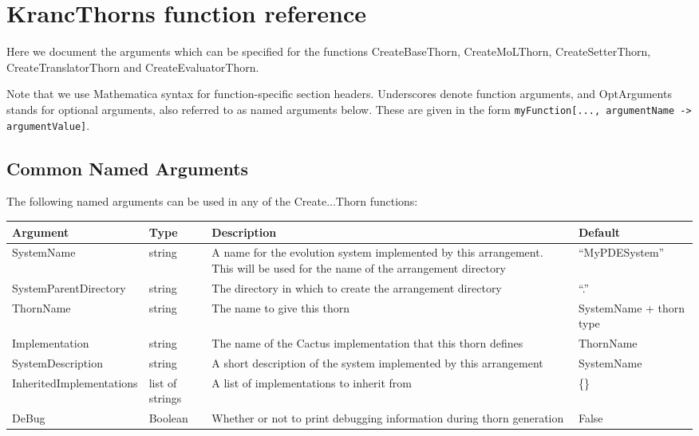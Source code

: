 \documentclass{report}
\newcommand{\tablewidth}{\textwidth}
\begin{document}
\section{KrancThorns function reference}
\label{app:function_reference}

Here we document the arguments which can be specified for the
functions CreateBaseThorn, CreateMoLThorn, CreateSetterThorn,
CreateTranslatorThorn and CreateEvaluatorThorn.

Note that we use Mathematica syntax for function-specific section headers.
Underscores denote function arguments, and OptArguments stands for optional
arguments, also referred to as named arguments below.  These
are given in the form {\tt myFunction[..., argumentName -> argumentValue]}.


\subsection{Common Named Arguments}
\label{app:common_arguments}

The following named arguments can be used in any of the Create...Thorn
functions:
\begin{center}
\begin{tabularx}{\tablewidth}{|X|l|X|X|}
  \hline
  \bf Argument & \bf Type & \bf Description & \bf Default\\
  \hline
  SystemName & string & A name for the evolution system implemented by this arrangement.
                        This will be used for the name of the arrangement directory
                          & ``MyPDESystem''\\
  SystemParentDirectory & string & The directory in which to create the arrangement directory & ``.''\\
  ThornName & string & The name to give this thorn & SystemName + thorn type\\
  Implementation & string & The name of the Cactus implementation that this thorn defines & ThornName\\
  SystemDescription & string & A short description of the system implemented by this arrangement & SystemName \\
  Inherited\-Implementations & list of strings & A list of implementations to inherit from & \{\} \\
  DeBug & Boolean & Whether or not to print debugging information during thorn generation& False\\
  \hline
\end{tabularx}
\end{center}
\end{document}
